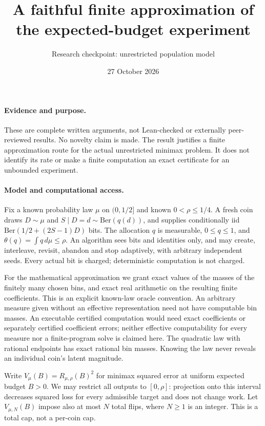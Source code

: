 \documentclass[11pt]{article}
\title{A faithful finite approximation of the expected-budget experiment}
\author{Research checkpoint: unrestricted population model}
\date{27 October 2026}
\begin{document}
\maketitle
\paragraph{Evidence and purpose.}
These are complete written arguments, not Lean-checked or externally
peer-reviewed results. No novelty claim is made. The result justifies a
finite approximation route for the actual unrestricted minimax problem. It
does not identify its rate or make a finite computation an exact certificate
for an unbounded experiment.

\paragraph{Model and computational access.}
Fix a known probability law $\mu$ on $(0,1/2]$ and known $0<\rho\le1/4$.
A fresh coin draws $D\sim\mu$ and $S\mid D=d\sim\mathrm{Ber}(q(d))$, and
supplies conditionally iid $\mathrm{Ber}(1/2+(2S-1)D)$ bits. The allocation
$q$ is measurable, $0\le q\le1$, and $\theta(q)=\int q\,d\mu\le\rho$.
An algorithm sees bits and identities only, and may create, interleave,
revisit, abandon and stop adaptively, with arbitrary independent seeds.
Every actual bit is charged; deterministic computation is not charged.

For the mathematical approximation we grant exact values of the masses of
the finitely many chosen bins, and exact real arithmetic on the resulting
finite coefficients. This is an explicit known-law oracle convention.
An arbitrary measure given without an effective representation need not have
computable bin masses. An executable certified computation would need exact
coefficients or separately certified coefficient errors; neither effective
computability for every measure nor a finite-program solve is claimed here.
The quadratic law with rational endpoints has exact rational bin masses.
Knowing the law never reveals an individual coin's latent magnitude.

Write $V_\mu(B)=R_{\mu,\rho}(B)^2$ for minimax squared error at uniform
expected budget $B>0$. We may restrict all outputs to $[0,\rho]$: projection
onto this interval decreases squared loss for every admissible target and
does not change work. Let $V_{\mu,N}(B)$ impose also at most $N$ total flips,
where $N\ge1$ is an integer. This is a total cap, not a per-coin cap.
\end{document}

